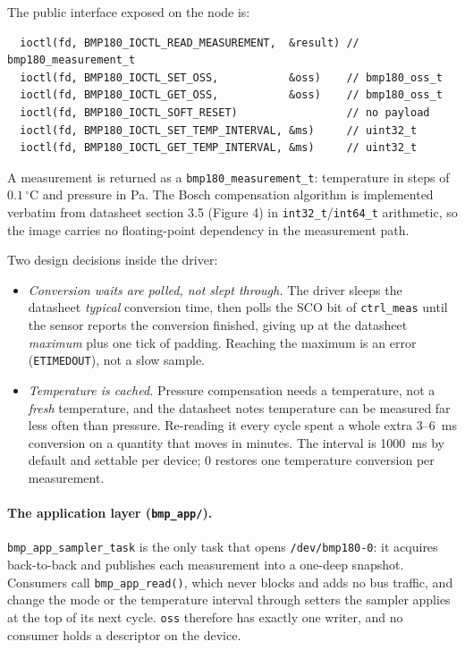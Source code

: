 \documentclass[10pt,a4]{article}
\begin{document}
The public interface exposed on the node is:

\begin{verbatim}
  ioctl(fd, BMP180_IOCTL_READ_MEASUREMENT,  &result) // bmp180_measurement_t
  ioctl(fd, BMP180_IOCTL_SET_OSS,           &oss)    // bmp180_oss_t
  ioctl(fd, BMP180_IOCTL_GET_OSS,           &oss)    // bmp180_oss_t
  ioctl(fd, BMP180_IOCTL_SOFT_RESET)                 // no payload
  ioctl(fd, BMP180_IOCTL_SET_TEMP_INTERVAL, &ms)     // uint32_t
  ioctl(fd, BMP180_IOCTL_GET_TEMP_INTERVAL, &ms)     // uint32_t
\end{verbatim}

A measurement is returned as a \texttt{bmp180\_measurement\_t}: temperature in
steps of $0.1\,^{\circ}$C and pressure in Pa. The Bosch compensation algorithm
is implemented verbatim from datasheet section 3.5 (Figure 4) in
\texttt{int32\_t}/\texttt{int64\_t} arithmetic, so the image carries no
floating-point dependency in the measurement path.

Two design decisions inside the driver:

\begin{itemize}
\item \emph{Conversion waits are polled, not slept through.} The driver sleeps
  the datasheet \emph{typical} conversion time, then polls the SCO bit of
  \texttt{ctrl\_meas} until the sensor reports the conversion finished, giving
  up at the datasheet \emph{maximum} plus one tick of padding. Reaching the
  maximum is an error (\texttt{ETIMEDOUT}), not a slow sample.
\item \emph{Temperature is cached.} Pressure compensation needs a temperature,
  not a \emph{fresh} temperature, and the datasheet notes temperature can be
  measured far less often than pressure. Re-reading it every cycle spent a whole
  extra 3--6~ms conversion on a quantity that moves in minutes. The interval is
  1000~ms by default and settable per device; 0 restores one temperature
  conversion per measurement.
\end{itemize}

\paragraph{The application layer (\texttt{bmp\_app/}).}
\texttt{bmp\_app\_sampler\_task} is the only task that opens
\texttt{/dev/bmp180-0}: it acquires back-to-back and publishes each measurement
into a one-deep snapshot. Consumers call \texttt{bmp\_app\_read()}, which never
blocks and adds no bus traffic, and change the mode or the temperature interval
through setters the sampler applies at the top of its next cycle. \texttt{oss}
therefore has exactly one writer, and no consumer holds a descriptor on the
device.
\end{document}
